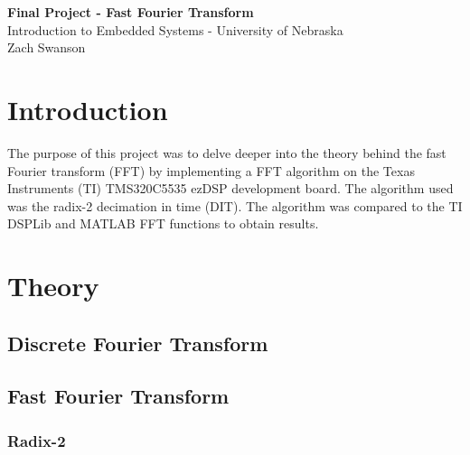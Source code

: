 \documentclass[11pt,pdftex,portrait,letterpaper]{article}
\begin{document}
\vspace*{30ex}
\begin{center}

\textbf{Final Project - Fast Fourier Transform }\\

\vspace{4ex}
Introduction to Embedded Systems - University of Nebraska \\

\vspace{4ex}
Zach Swanson\\

\end{center}


\pagebreak
\tableofcontents
\pagebreak


\section{Introduction}

The purpose of this project was to delve deeper into the theory behind the fast Fourier transform (FFT) by implementing a FFT algorithm on the Texas Instruments (TI) TMS320C5535 ezDSP development board. The algorithm used was the radix-2 decimation in time (DIT). The algorithm was compared to the TI DSPLib and MATLAB FFT functions to obtain results.


\section{Theory}

\subsection{Discrete Fourier Transform}

\subsection{Fast Fourier Transform}

\subsubsection{Radix-2}

\end{document}
